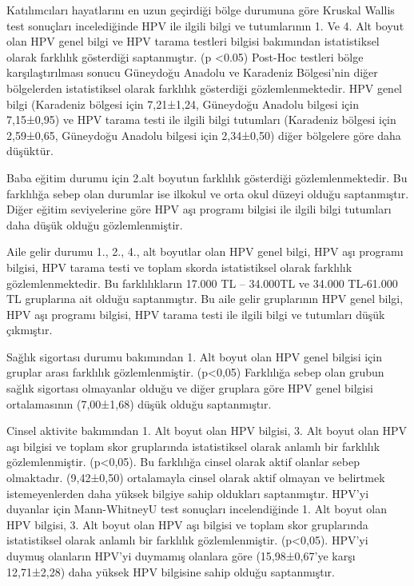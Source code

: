 \documentclass[turkish]{article}
\begin{document}
Katılımcıları hayatlarını en uzun geçirdiği bölge durumuna göre Kruskal Wallis test sonuçları incelediğinde HPV ile ilgili bilgi ve tutumlarının 1. Ve 4. Alt boyut olan HPV genel bilgi ve HPV tarama testleri bilgisi bakımından istatistiksel olarak farklılık gösterdiği saptanmıştır. (p <0.05) Post-Hoc testleri bölge karşılaştırılması sonucu Güneydoğu Anadolu ve Karadeniz Bölgesi’nin diğer bölgelerden istatistiksel olarak farklılık gösterdiği gözlemlenmektedir. HPV genel bilgi (Karadeniz bölgesi için 7,21±1,24, Güneydoğu Anadolu bilgesi için 7,15±0,95) ve HPV tarama testi ile ilgili bilgi tutumları (Karadeniz bölgesi için 2,59±0,65, Güneydoğu Anadolu bilgesi için 2,34±0,50) diğer bölgelere göre daha düşüktür.

Baba eğitim durumu için 2.alt boyutun farklılık gösterdiği gözlemlenmektedir. Bu farklılığa sebep olan durumlar ise ilkokul ve orta okul düzeyi olduğu saptanmıştır. Diğer eğitim seviyelerine göre HPV aşı programı bilgisi ile ilgili bilgi tutumları daha düşük olduğu gözlemlenmiştir.

Aile gelir durumu 1., 2., 4., alt boyutlar olan HPV genel bilgi, HPV aşı programı bilgisi, HPV tarama testi ve toplam skorda istatistiksel olarak farklılık gözlemlenmektedir. Bu farklılıkların 17.000 TL – 34.000TL ve 34.000 TL-61.000 TL gruplarına ait olduğu saptanmıştır. Bu aile gelir gruplarının HPV genel bilgi, HPV aşı programı bilgisi, HPV tarama testi ile ilgili bilgi ve tutumları düşük çıkmıştır.

Sağlık sigortası durumu bakımından 1. Alt boyut olan HPV genel bilgisi için gruplar arası farklılık gözlemlenmiştir. (p<0,05) Farklılığa sebep olan grubun sağlık sigortası olmayanlar olduğu ve diğer gruplara göre HPV genel bilgisi ortalamasının (7,00±1,68) düşük olduğu saptanmıştır.

Cinsel aktivite bakımından 1. Alt boyut olan HPV bilgisi, 3. Alt boyut olan HPV aşı bilgisi ve toplam skor gruplarında istatistiksel olarak anlamlı bir farklılık gözlemlenmiştir. (p<0,05). Bu farklılığa cinsel olarak aktif olanlar sebep olmaktadır. (9,42±0,50) ortalamayla cinsel olarak aktif olmayan ve belirtmek istemeyenlerden daha yüksek bilgiye sahip oldukları saptanmıştır.
HPV’yi duyanlar için Mann-WhitneyU test sonuçları incelendiğinde 1. Alt boyut olan HPV bilgisi, 3. Alt boyut olan HPV aşı bilgisi ve toplam skor gruplarında istatistiksel olarak anlamlı bir farklılık gözlemlenmiştir. (p<0,05). HPV’yi duymuş olanların HPV’yi duymamış olanlara göre (15,98±0,67'ye karşı 12,71±2,28) daha yüksek HPV bilgisine sahip olduğu saptanmıştır.
\end{document}
